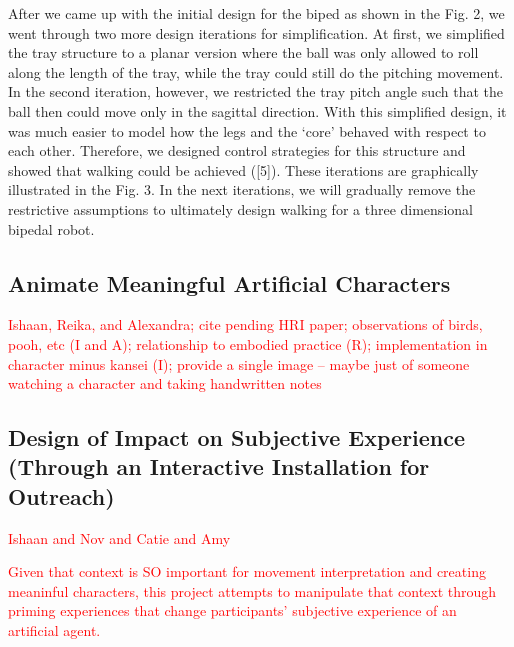 \documentclass[arts,article,submit,moreauthors,pdftex,10pt,a4paper]{mdpi}
\begin{document}
After we came up with the initial design for the biped as shown in the Fig. 2, we went through two more design iterations for simplification. At first, we simplified the tray structure to a planar version where the ball was only allowed to roll along the length of the tray, while the tray could still do the pitching movement. In the second iteration, however, we restricted the tray pitch angle such that the ball then could move only in the sagittal direction. With this simplified design, it was much easier to model how the legs and the ‘core’ behaved with respect to each other. Therefore, we designed control strategies for this structure and showed that walking could be achieved ([5]). These iterations are graphically illustrated in the Fig. 3. In the next iterations, we will gradually remove the restrictive assumptions to ultimately design walking for a three dimensional bipedal robot.



\subsection{Animate Meaningful Artificial Characters}

\textcolor{red}{Ishaan, Reika, and Alexandra; cite pending HRI paper; observations of birds, pooh, etc (I and A); relationship to embodied practice (R); implementation in character minus kansei (I); provide a single image -- maybe just of someone watching a character and taking handwritten notes}

\subsection{Design of Impact on Subjective Experience (Through an Interactive Installation for Outreach)}

\textcolor{red}{Ishaan and Nov and Catie and Amy}

\textcolor{red}{Given that context is SO important for movement interpretation and creating meaninful characters, this project attempts to manipulate that context through priming experiences that change participants' subjective experience of an artificial agent.}
\end{document}
